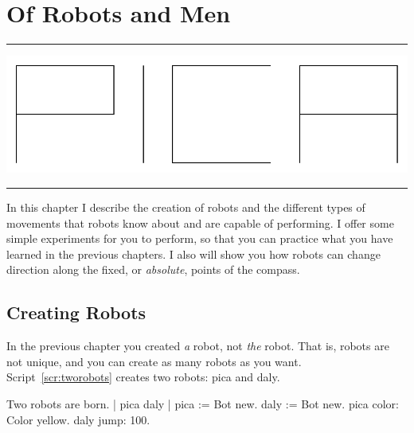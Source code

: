 \documentclass[a4paper,10pt,twoside]{book}
\begin{document}
    \sloppy
\fi

\chapter{Of Robots and Men}\label{cha:robots}

\noindent\hrule
\includegraphics[width=0.9\linewidth]{turtleMPica}
\noindent\hrule\vspace{1.5cm}

In this chapter I describe the creation of robots and the different types of movements that 
robots know about and are capable of performing. I offer some simple experiments for you to 
perform, so that you can practice what you have learned in the previous chapters. I also will 
show you how robots can change direction along the fixed, or \emph{absolute}, points of the compass.





\newpage
\section{Creating Robots}

In the previous chapter you created \emph{a} robot, not \emph{the} robot. That is, robots are not unique, and 
you can create as many robots as you want. Script~\ref{scr:tworobots} creates two robots: pica and daly. 

\begin{script}[tworobots]{Two robots are born.}
| pica daly | 
pica := Bot new. 
daly := Bot new. 
pica color: Color yellow. 
daly jump: 100. 
\end{script}
\end{document}
